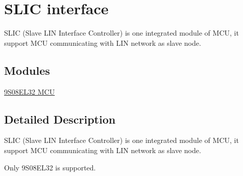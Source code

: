 \hypertarget{group___s_l_i_c__group}{}\section{S\+L\+I\+C interface}
\label{group___s_l_i_c__group}


S\+L\+I\+C (Slave L\+I\+N Interface Controller) is one integrated module of M\+C\+U, it support M\+C\+U communicating with L\+I\+N network as slave node.  


\subsection*{Modules}
\begin{DoxyCompactItemize}
\item 
\hyperlink{group__s08el32__group}{9\+S08\+E\+L32 M\+C\+U}
\end{DoxyCompactItemize}


\subsection{Detailed Description}
S\+L\+I\+C (Slave L\+I\+N Interface Controller) is one integrated module of M\+C\+U, it support M\+C\+U communicating with L\+I\+N network as slave node. 

Only 9\+S08\+E\+L32 is supported. 